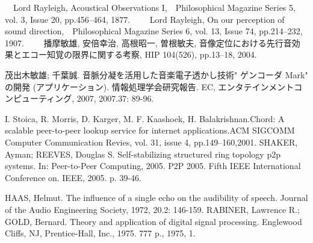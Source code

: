 \begin{thebibliography}{99}
　Lord Rayleigh, Acoustical Observations I,　Philosophical Magazine Series 5, vol. 3, Issue 20, pp.456--464, 1877.　%
　Lord Rayleigh, On our perception of sound direction,　Philosophical Magazine Series 6, vol. 13, Issue 74, pp.214--232, 1907.　%
　播摩敏雄, 安倍幸治, 高根昭一, 曽根敏夫, 音像定位における先行音効果とエコー知覚の限界に関する考察, HIP 104(526), pp.13--18, 2004. %


 茂出木敏雄; 千葉誠. 音脈分凝を活用した音楽電子透かし技術" ゲンコーダ Mark" の開発 (アプリケーション). 情報処理学会研究報告. EC, エンタテインメントコンピューティング, 2007, 2007.37: 89-96.

I. Stoica, R. Morris, D. Karger, M. F. Kaashoek, H. Balakrishnan.Chord: A scalable peer-to-peer lookup service for internet applications.ACM SIGCOMM Computer Communication Revies, vol. 31, issue 4, pp.149--160,2001.
 SHAKER, Ayman; REEVES, Douglas S. Self-stabilizing structured ring topology p2p systems. In: Peer-to-Peer Computing, 2005. P2P 2005. Fifth IEEE International Conference on. IEEE, 2005. p. 39-46.



      HAAS, Helmut. The influence of a single echo on the audibility of speech. Journal of the Audio Engineering Society, 1972, 20.2: 146-159.
  RABINER, Lawrence R.; GOLD, Bernard. Theory and application of digital signal processing. Englewood Cliffs, NJ, Prentice-Hall, Inc., 1975. 777 p., 1975, 1.



\end{thebibliography}
